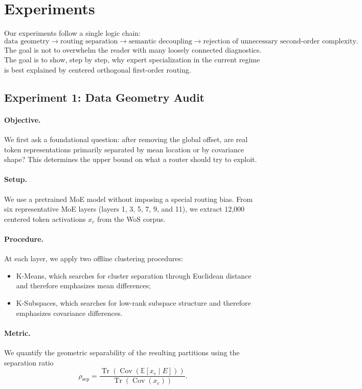 \section{Experiments}
\label{sec:experiments}

Our experiments follow a single logic chain:
$$
\text{data geometry}
\rightarrow
\text{routing separation}
\rightarrow
\text{semantic decoupling}
\rightarrow
\text{rejection of unnecessary second-order complexity}.
$$
The goal is not to overwhelm the reader with many loosely connected diagnostics. The goal is to show, step by step, why expert specialization in the current regime is best explained by centered orthogonal first-order routing.

\subsection{Experiment 1: Data Geometry Audit}
\paragraph{Objective.}
We first ask a foundational question: after removing the global offset, are real token representations primarily separated by mean location or by covariance shape? This determines the upper bound on what a router should try to exploit.

\paragraph{Setup.}
We use a pretrained MoE model without imposing a special routing bias. From six representative MoE layers (layers 1, 3, 5, 7, 9, and 11), we extract 12{,}000 centered token activations $x_c$ from the WoS corpus.

\paragraph{Procedure.}
At each layer, we apply two offline clustering procedures:
\begin{itemize}
    \item K-Means, which searches for cluster separation through Euclidean distance and therefore emphasizes mean differences;
    \item K-Subspaces, which searches for low-rank subspace structure and therefore emphasizes covariance differences.
\end{itemize}

\paragraph{Metric.}
We quantify the geometric separability of the resulting partitions using the separation ratio
$$
\rho_{\mathrm{sep}}
=
\frac{\operatorname{Tr}(\operatorname{Cov}(\mathbb{E}[x_c\mid E]))}
{\operatorname{Tr}(\operatorname{Cov}(x_c))}.
$$

